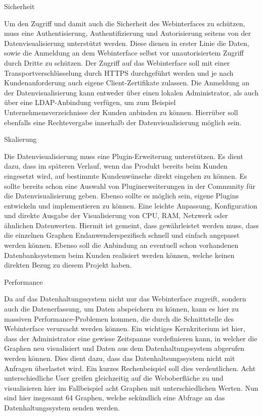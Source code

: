 {Sicherheit
\begin{outline}
  \1 Um den Zugriff und damit auch die Sicherheit des Webinterfaces zu
  schützen, muss eine Authentisierung, Authentifizierung und Autorisierung
  seitens von der Datenvisualisierung unterstützt werden.  Diese dienen in
  erster Linie die Daten, sowie die Anmeldung an dem Webinterface selbst vor
  unautorisiertem Zugriff durch Dritte zu schützen. Der Zugriff auf das
  Webinterface soll mit einer Transportverschlüsselung durch \gls{HTTPS}
  durchgeführt werden und je nach Kundenanforderung auch eigene
  Client-Zertifikate zulassen. Die Anmeldung an der Datenvisualisierung kann
  entweder über einen lokalen Administrator, als auch über eine
  \gls{LDAP}-Anbindung verfügen, um zum Beispiel Unternehmensverzeichnisse der
  Kunden anbinden zu können. Hierrüber soll ebenfalls eine Rechtevergabe
  innerhalb der Datenvisualisierung möglich sein.
\end{outline}

Skalierung
\begin{outline}
  \1 Die Datenvisualisierung muss eine Plugin-Erweiterung unterstützen. Es
  dient dazu, dass im späteren Verlauf, wenn das Produkt bereits beim Kunden
  eingesetzt wird, auf bestimmte Kundenwünsche direkt eingehen zu können. Es
  sollte bereits schon eine Auswahl von Pluginerweiterungen in der Community
  für die Datenvisualisierung geben. Ebenso sollte es möglich sein, eigene
  Plugins entwickeln und implementieren zu können.
  \1 Eine leichte Anpassung, Konfiguration und direkte Ausgabe der
  Visualisierung von CPU, RAM, Netzwerk oder ähnlichen Datenwerten. Hiermit ist
  gemeint, dass gewährleistet werden muss, dass die einzelnen Graphen
  Endanwenderspezifisch schnell und einfach angepasst werden können. Ebenso
  soll die Anbindung an eventuell schon vorhandenen Datenbanksystemen beim
  Kunden realisiert werden können, welche keinen direkten Bezug zu diesem
  Projekt haben.
\end{outline}

Performance
\begin{outline}
  \1 Da auf das Datenhaltungssystem nicht nur das Webinterface zugreift,
  sondern auch die Datenerfassung, um Daten abspeichern zu können, kann es hier
  zu massiven Performance-Problemen kommen, die durch die Schnittstelle des
  Webinterface verursacht werden können. Ein wichtiges Kernkriterium ist hier,
  dass der Administrator eine gewisse Zeitspanne vordefinieren kann, in welcher
  die Graphen neu visualisiert und Daten aus dem Datenhaltungssystem abgerufen
  werden können.  Dies dient dazu, dass das Datenhaltsungssystem nicht mit
  Anfragen überlastet wird. Ein kurzes Rechenbeispiel soll dies verdeutlichen.
  Acht unterschiedliche User greifen gleichzeitig auf die Weboberfläche zu und
  visualisieren hier im Fallbeispiel acht Graphen mit unterschiedlichen Werten.
  Nun sind hier insgesamt 64 Graphen, welche sekündlich eine Abfrage an das
  Datenhaltungssystem senden werden.
\end{outline}

}
